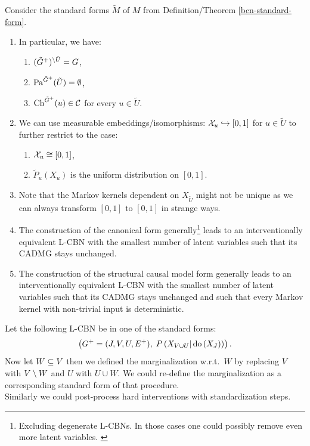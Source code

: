 \begin{Rem} Consider the standard forms $\tilde M$ of $M$ from Definition/Theorem \ref{bcn-standard-form}.
    \begin{enumerate}
        \item In particular, we have:
    \begin{enumerate}
      \item $(\tilde G^+)^{\setminus \tilde U} = G$,
     \item $\mathrm{Pa}^{\tilde G^+}(\tilde U) = \emptyset$,
     \item $\mathrm{Ch}^{\tilde G^+}(u) \in \mathcal{C}$ for every $u \in \tilde U$.
    \end{enumerate}
  \item We can use measurable embeddings/isomorphisms: $\mathcal{X}_u \hookrightarrow [0,1]$ for $u \in \tilde U$ to further restrict to the case:
\begin{enumerate}
    \item $\mathcal{X}_u \cong [0,1]$,
    \item $\tilde P_u(X_u)$ is the uniform distribution on $[0,1]$.
\end{enumerate}
    \item Note that the Markov kernels dependent on $X_{\tilde U}$ might not be unique as we can always transform $[0,1]$ to $[0,1]$ in strange ways.
    \item The construction of the canonical form generally\footnote{Excluding degenerate L-CBNs. In those cases one could possibly remove even more latent variables. \label{ref:can-form-deg}} leads to an interventionally equivalent L-CBN with the smallest number of latent variables such that its \observational CADMG stays unchanged. 
    \item The construction of the structural causal model form generally leads to an interventionally equivalent L-CBN with the smallest number of latent variables such that its \observational CADMG stays unchanged and such that every Markov kernel with non-trivial input is deterministic. 
    \end{enumerate}
\end{Rem}

\begin{Rem}
    Let the following L-CBN be in one of the standard forms:    
    \[ \left ( G^+=(J,V,U,E^+), \; P\left ( X_{V \cup U}| \operatorname{do}\left ( X_{J} \right )\right ) \right ).\]
    Now let $W \subseteq V$ then we defined the marginalization w.r.t.\ $W$ by replacing $V$ with $V \setminus W$ and $U$ with $U \cup W$.
    We could re-define the marginalization as a corresponding standard form of that procedure.\\
    Similarly we could post-process hard interventions with standardization steps.
\end{Rem}




